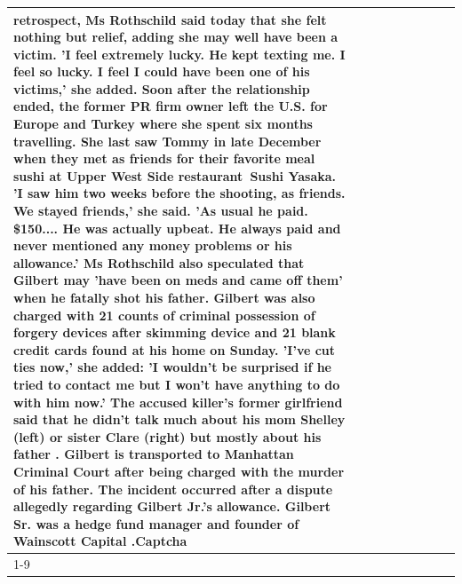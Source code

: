 \begin{table}[H]
\begin{tabular}{lllrlllll}
retrospect, Ms Rothschild said today that she felt nothing but relief, adding she may well have been a victim. 'I feel extremely lucky. He kept texting me. I feel so lucky. I feel I could have been one of his victims,' she added. Soon after the relationship ended, the former PR firm owner left the U.S. for Europe and Turkey where she spent six months  travelling. She last saw Tommy in late December when they met as friends for their favorite meal sushi at Upper West Side restaurant Sushi Yasaka. 'I saw him two weeks before the shooting, as friends. We stayed friends,' she said. 'As usual he paid. \$150.... He was actually upbeat. He always paid and never mentioned any money problems or his allowance.' Ms Rothschild also speculated that Gilbert may 'have been on meds and came off them' when he fatally shot his father. Gilbert was also charged with 21 counts of criminal possession of forgery devices after skimming device and 21 blank credit cards found at his home on Sunday. 'I've cut ties now,' she added: 'I wouldn’t be surprised if he tried to contact me but I won’t have anything to do with him now.' The accused killer's former girlfriend said that he didn't talk much about his mom Shelley (left) or sister Clare (right) but mostly about his father . Gilbert is transported to Manhattan Criminal Court  after being charged with the murder of his father. The incident occurred after a dispute allegedly regarding Gilbert Jr.'s allowance. Gilbert Sr. was a hedge fund manager and founder of Wainscott Capital .Captcha \\
\cline{1-9} \cline{2-9}

\end{tabular}
\end{table}
